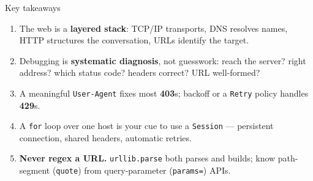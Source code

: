 \documentclass[9pt,aspectratio=169]{beamer}
\begin{document}
\begin{frame}{Key takeaways}
    \begin{enumerate}
        \item The web is a \textbf{layered stack}: TCP/IP transports, DNS resolves names, HTTP structures the conversation, URLs identify the target.
        \item Debugging is \textbf{systematic diagnosis}, not guesswork: reach the server? right address? which status code? headers correct? URL well-formed?
        \item A meaningful \texttt{User-Agent} fixes most \textbf{403}s; backoff or a \texttt{Retry} policy handles \textbf{429}s.
        \item A \texttt{for} loop over one host is your cue to use a \texttt{Session} --- persistent connection, shared headers, automatic retries.
        \item \textbf{Never regex a URL.} \texttt{urllib.parse} both parses and builds; know path-segment (\texttt{quote}) from query-parameter (\texttt{params=}) APIs.
    \end{enumerate}
    \vspace{1em}
\end{frame}
\end{document}

